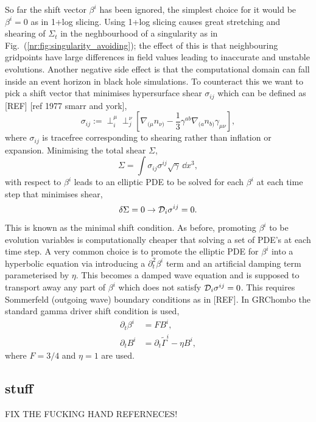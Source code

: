 So far the shift vector $\beta^i$ has been ignored, the simplest choice for it would be $\beta^i=0$ as in 1+log slicing. Using 1+log slicing causes great stretching and shearing of $\Sigma_t$ in the neghbourhood of a singularity as in Fig.~(\ref{nr:fig:singularity_avoiding}); the effect of this is that neighbouring gridpoints have large differences in field values leading to inaccurate and unstable evolutions. Another negative side effect is that the computational domain can fall inside an event horizon in black hole simulations. To counteract this we want to pick a shift vector that minimises hypersurface shear $\sigma_{ij}$ which can be defined as [REF] [ref 1977 smarr and york], 
\begin{equation} \sigma_{ij}:= \perp^\mu_i \perp^\nu_j \left[\nabla_{(\mu} n_{\nu)}-\frac{1}{3}\gamma^{ab}\nabla_{(a} n_{b)} \gamma_{\mu\nu}\right], \end{equation}
where $\sigma_{ij}$ is tracefree corresponding to shearing rather than inflation or expansion. Minimising the total shear $\Sigma$,
\begin{equation} \Sigma = \int \sigma_{ij}\sigma^{ij}\sqrt{\gamma}\,\dd x^3,\end{equation}
with respect to $\beta^i$ leads to an elliptic PDE to be solved for each $\beta^i$ at each time step that minimises shear, 
\begin{equation} \delta \Sigma = 0 \rightarrow \mathcal{D}_i\sigma^{ij}=0.\end{equation}
This is known as the minimal shift condition. As before, promoting $\beta^i$ to be evolution variables is computationally cheaper that solving a set of PDE's at each time step. A very common choice is to promote the elliptic PDE for $\beta^i$ into a hyperbolic equation via introducing a $\partial_t^2\beta^i$ term and an artificial damping term parameterised by $\eta$. This becomes a damped wave equation and is supposed to transport away any part of $\beta^i$ which does not satisfy $\mathcal{D}_i \sigma^{ij}=0$. This requires Sommerfeld (outgoing wave) boundary conditions as in [REF]. In GRChombo the standard gamma driver shift condition is used,
\begin{align} \partial_t \beta^i &= FB^i,\\
 \partial_t B^i &= \partial_t \tilde{\Gamma}^i - \eta B^i,\end{align}
where $F=3/4$ and $\eta=1$ are used.


\subsection{stuff}
FIX THE FUCKING HAND REFERNECES!


